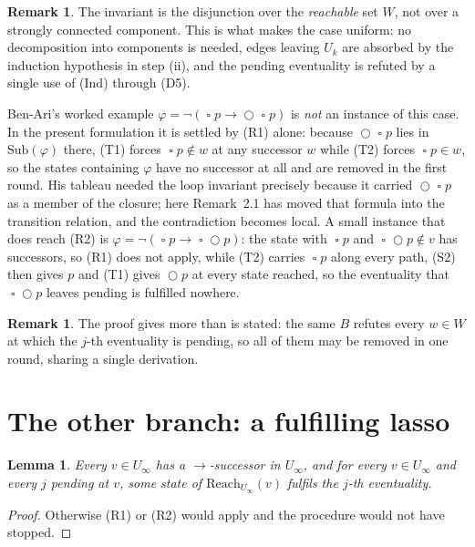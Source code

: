 \documentclass[11pt,a4paper]{article}
\newtheorem{lemma}[theorem]{Lemma}
\theoremstyle{definition}
\newtheorem{remark}[theorem]{Remark}
\newcommand{\Next}{\mathop{\bigcirc}}
\newcommand{\Always}{\mathop{\square}}
\newcommand{\Sub}{\mathrm{Sub}}
\newcommand{\Reach}{\mathrm{Reach}}
\begin{document}
\begin{remark}
The invariant is the disjunction over the \emph{reachable} set $W$, not over a
strongly connected component.  This is what makes the case uniform: no
decomposition into components is needed, edges leaving $U_k$ are absorbed by the
induction hypothesis in step (ii), and the pending eventuality is refuted by a
single use of (Ind) through (D5).

Ben-Ari's worked example $\varphi=\neg(\Always p\to\Next\Always p)$ is
\emph{not} an instance of this case.  In the present formulation it is settled
by (R1) alone: because $\Next\Always p$ lies in $\Sub(\varphi)$ there, (T1)
forces $\Always p\notin w$ at any successor $w$ while (T2) forces
$\Always p\in w$, so the states containing $\varphi$ have no successor at all
and are removed in the first round.  His tableau needed the loop invariant
precisely because it carried $\Next\Always p$ as a member of the closure; here
Remark~2.1 has moved that formula into the transition relation, and the
contradiction becomes local.  A small instance that does reach (R2) is
$\varphi=\neg(\Always p\to\Always\Next p)$: the state with $\Always p$ and
$\Always\Next p\notin v$ has successors, so (R1) does not apply, while (T2)
carries $\Always p$ along every path, (S2) then gives $p$ and (T1) gives
$\Next p$ at every state reached, so the eventuality that $\Always\Next p$
leaves pending is fulfilled nowhere.
\end{remark}

\begin{remark}
The proof gives more than is stated: the same $B$ refutes every $w\in W$ at
which the $j$-th eventuality is pending, so all of them may be removed in one
round, sharing a single derivation.
\end{remark}

\section{The other branch: a fulfilling lasso}

\begin{lemma}\label{lem:fix}
Every $v\in U_\infty$ has a $\to$-successor in $U_\infty$, and for every
$v\in U_\infty$ and every $j$ pending at $v$, some state of
$\Reach_{U_\infty}(v)$ fulfils the $j$-th eventuality.
\end{lemma}

\begin{proof}
Otherwise (R1) or (R2) would apply and the procedure would not have stopped.
\end{proof}
\end{document}
